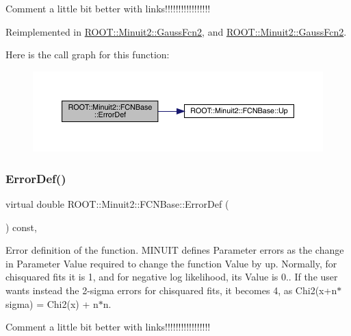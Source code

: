 Comment a little bit better with links!!!!!!!!!!!!!!!!! 

Reimplemented in \mbox{\hyperlink{classROOT_1_1Minuit2_1_1GaussFcn2_ac240f7b6ecbb7bf842d786e3914c620a}{R\+O\+O\+T\+::\+Minuit2\+::\+Gauss\+Fcn2}}, and \mbox{\hyperlink{classROOT_1_1Minuit2_1_1GaussFcn2_ac240f7b6ecbb7bf842d786e3914c620a}{R\+O\+O\+T\+::\+Minuit2\+::\+Gauss\+Fcn2}}.

Here is the call graph for this function\+:
\nopagebreak
\begin{figure}[H]
\begin{center}
\leavevmode
\includegraphics[width=350pt]{dd/df4/classROOT_1_1Minuit2_1_1FCNBase_ac4592475c58a65b037ba97ab5f3cba10_cgraph}
\end{center}
\end{figure}
\mbox{\label{classROOT_1_1Minuit2_1_1FCNBase_ac4592475c58a65b037ba97ab5f3cba10}} 
\subsubsection{\texorpdfstring{ErrorDef()}{ErrorDef()}\hspace{0.1cm}{\footnotesize\ttfamily [2/3]}}
{\footnotesize\ttfamily virtual double R\+O\+O\+T\+::\+Minuit2\+::\+F\+C\+N\+Base\+::\+Error\+Def (\begin{DoxyParamCaption}{ }\end{DoxyParamCaption}) const\hspace{0.3cm}{\ttfamily [inline]}, {\ttfamily [virtual]}}

Error definition of the function. M\+I\+N\+U\+IT defines Parameter errors as the change in Parameter Value required to change the function Value by up. Normally, for chisquared fits it is 1, and for negative log likelihood, its Value is 0.. If the user wants instead the 2-\/sigma errors for chisquared fits, it becomes 4, as Chi2(x+n$\ast$sigma) = Chi2(x) + n$\ast$n.

Comment a little bit better with links!!!!!!!!!!!!!!!!! 

